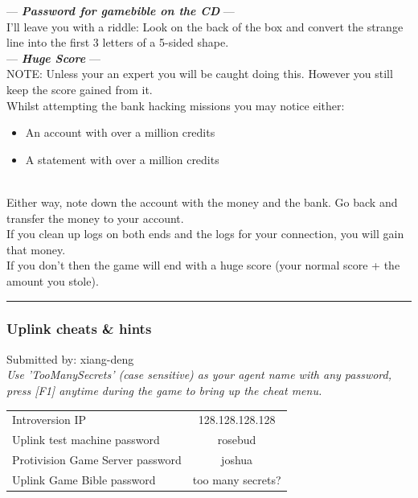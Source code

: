 \documentclass[11pt,twoside,a4paper]{book}
\begin{document}
--- \textbf{\emph{Password for gamebible on the CD}} --- ~\\
I'll leave you with a riddle: Look on the back of the box and convert the strange line into the first 3 letters of a 5-sided shape. ~\\

--- \textbf{\emph{Huge Score}} --- ~\\
NOTE: Unless your an expert you will be caught doing this. However you still keep the score gained from it. ~\\

Whilst attempting the bank hacking missions you may notice either:
\begin{itemize}
	\item An account with over a million credits
	\item A statement with over a million credits
\end{itemize} ~\\

Either way, note down the account with the money and the bank. Go back and transfer the money to your account. ~\\
If you clean up logs on both ends and the logs for your connection, you will gain that money. ~\\
If you don't then the game will end with a huge score (your normal score + the amount you stole). %

\begin{center} \rule{0.85\textwidth}{0.01cm} \end{center}

\subsubsection{Uplink cheats \& hints}

Submitted by: xiang-deng ~\\

\emph{Use 'TooManySecrets' (case sensitive) as your agent name with any password, press [F1] anytime during the game to bring up the cheat menu. }~\\

\begin{tabular}[ht]{ p{5cm} c }
	Introversion IP						&	128.128.128.128		\\
	Uplink test machine password		&	rosebud				\\
	Protivision Game Server password	&	joshua				\\
	Uplink Game Bible password			&	too many secrets?	\\
\end{tabular}
\end{document}
